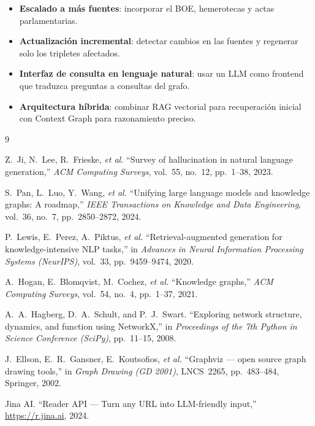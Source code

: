 \documentclass[12pt,a4paper]{article}
\begin{document}
\begin{itemize}
  \item \textbf{Escalado a más fuentes}: incorporar el BOE, hemerotecas y actas parlamentarias.
  \item \textbf{Actualización incremental}: detectar cambios en las fuentes y regenerar solo los tripletes afectados.
  \item \textbf{Interfaz de consulta en lenguaje natural}: usar un LLM como frontend que traduzca preguntas a consultas del grafo.
  \item \textbf{Arquitectura híbrida}: combinar RAG vectorial para recuperación inicial con Context Graph para razonamiento preciso.
\end{itemize}

\begin{thebibliography}{9}

Z.~Ji, N.~Lee, R.~Frieske, \textit{et al.}
``Survey of hallucination in natural language generation,'' \textit{ACM Computing Surveys}, vol.~55, no.~12, pp.~1--38, 2023.

S.~Pan, L.~Luo, Y.~Wang, \textit{et al.}
``Unifying large language models and knowledge graphs: A roadmap,'' \textit{IEEE Transactions on Knowledge and Data Engineering}, vol.~36, no.~7, pp.~2850--2872, 2024.

P.~Lewis, E.~Perez, A.~Piktus, \textit{et al.}
``Retrieval-augmented generation for knowledge-intensive NLP tasks,'' in \textit{Advances in Neural Information Processing Systems (NeurIPS)}, vol.~33, pp.~9459--9474, 2020.

A.~Hogan, E.~Blomqvist, M.~Cochez, \textit{et al.}
``Knowledge graphs,'' \textit{ACM Computing Surveys}, vol.~54, no.~4, pp.~1--37, 2021.

A.~A.~Hagberg, D.~A.~Schult, and P.~J.~Swart.
``Exploring network structure, dynamics, and function using NetworkX,'' in \textit{Proceedings of the 7th Python in Science Conference (SciPy)}, pp.~11--15, 2008.

J.~Ellson, E.~R.~Gansner, E.~Koutsofios, \textit{et al.}
``Graphviz --- open source graph drawing tools,'' in \textit{Graph Drawing (GD 2001)}, LNCS~2265, pp.~483--484, Springer, 2002.

Jina AI.
``Reader API --- Turn any URL into LLM-friendly input,'' \url{https://r.jina.ai}, 2024.

\end{thebibliography}
\end{document}
